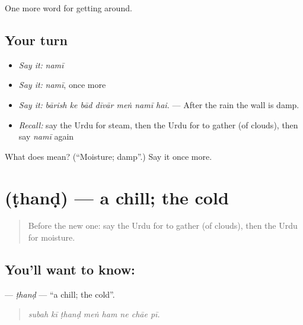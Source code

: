 \begin{grammarlens}[title={What you've built}]
One more word for getting around.
\end{grammarlens}

\subsection*{Your turn}
\begin{itemize}
\raggedright
  \item \emph{Say it:} \emph{namī}
  \item \emph{Say it:} \emph{namī}, once more
  \item \emph{Say it:} \emph{bārish ke bād dīvār meṅ namī hai.} — After the rain the wall is damp.
  \item \emph{Recall:} say the Urdu for steam, then the Urdu for to gather (of clouds), then say \emph{namī} again
\end{itemize}

\begin{tcolorbox}[breakable,colback=teal!4,colframe=teal!35!black,title={Before you move on}]
What does  mean? (\textquotedblleft{}Moisture; damp\textquotedblright{}.) Say it once more.
\end{tcolorbox}
\section[\texorpdfstring{\ur{ٹھنڈ} (ṭhanḍ)}{ٹھنڈ (ṭhanḍ)}]{ (ṭhanḍ) — a chill; the cold}

\label{lesson:UR-C429-thand}



\begin{quote}
Before the new one: say the Urdu for to gather (of clouds), then the Urdu for moisture.
\end{quote}

\subsection*{You'll want to know: }
\textbf{} — \emph{ṭhanḍ} — \textquotedblleft{}a chill; the cold\textquotedblright{}.

\begin{quote}
       
\end{quote}

\begin{quote}
\emph{subah kī ṭhanḍ meṅ ham ne chāe pī.}
\end{quote}

